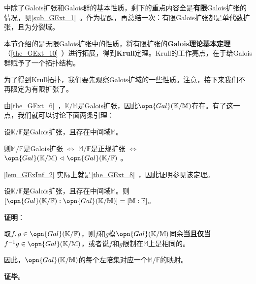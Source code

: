 


中除了Galois扩张和Galois群的基本性质，剩下的重点内容全是\textbf{有限}Galois扩张的情况，见\autoref{sub_GExt_1}~。作为提醒，再总结一次：有限Galois扩张都是单代数扩张，且为分裂域。

本节介绍的是无限Galois扩张中的性质，将有限扩张的\textbf{Galois理论基本定理}（\autoref{the_GExt_10}~）进行拓展，得到\textbf{Krull}定理。Krull的工作亮点，在于给Galois群赋予了一个拓扑结构。


为了得到Krull拓扑，我们要先观察Galois扩域的一些性质。注意，接下来我们不再限定为有限扩张了。


由\autoref{the_GExt_6}~，$\mathbb{K}/\mathbb{M}$是Galois扩张，因此$\opn{Gal}(\mathbb{K}/\mathbb{M})$存在。有了这一点，我们就可以讨论下面两条引理：

\begin{lemma}{}\label{lem_GExInf_2}
设$\mathbb{K}/\mathbb{F}$是Galois扩张，且存在中间域$\mathbb{M}$。

则$\mathbb{M}/\mathbb{F}$是Galois扩张 $\iff$ $\mathbb{M}/\mathbb{F}$是正规扩张 $\iff$ $\opn{Gal}(\mathbb{K}/\mathbb{M})\vartriangleleft \opn{Gal}(\mathbb{K}/\mathbb{F})$ 。
\end{lemma}

\autoref{lem_GExInf_2} 实际上就是\autoref{the_GExt_8}~，因此证明参见该定理。


\begin{lemma}{}\label{lem_GExInf_1}
设$\mathbb{K}/\mathbb{F}$是Galois扩张，且存在中间域$\mathbb{M}$。则$[\opn{Gal}(\mathbb{K}/\mathbb{F}):\opn{Gal}(\mathbb{K}/\mathbb{M})]=[\mathbb{M}:\mathbb{F}]$。


\end{lemma}


\textbf{证明}：

取$f, g\in\opn{Gal}(\mathbb{K}/\mathbb{F})$，则$f$和$g$模$\opn{Gal}(\mathbb{K}/\mathbb{M})$同余\textbf{当且仅当}$f^{-1}g\in\opn{Gal}(\mathbb{K}/\mathbb{M})$，或者说$f$和$g$限制在$\mathbb{M}$上是相同的。

因此，$\opn{Gal}(\mathbb{K}/\mathbb{M})$的每个左陪集对应一个$\mathbb{M}/\mathbb{F}$的映射。

\textbf{证毕}。


